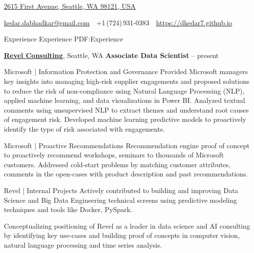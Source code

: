 \documentclass[letterpaper,MMMyyyy,nonstopmode]{simpleresumecv}
\newcommand{\CVAuthor}{Kedar Dabhadkar}
\newcommand{\CVWebpage}{https://dkedar7.github.io}
\begin{document}

\Title{\CVAuthor}

\begin{SubTitle}
\href{https://www.google.com/maps/place/2619+First+Avenue,+Seattle,+WA+98121,+USA}
{2615 First Avenue, Seattle, WA 98121, USA}
\par
\href{mailto:kedar.dabhadkar@gmail.com}
{kedar.dabhadkar@gmail.com}
\,\SubBulletSymbol\,
+1\,(724)\,931-0383
\,\SubBulletSymbol\,
\href{\CVWebpage}
{\url{\CVWebpage}}
\end{SubTitle}

\begin{Body}

\Section
{Experience}
{Experience}
{PDF:Experience}

\Entry
\href{http://www.revelconsulting.com/}
{\textbf{Revel Consulting}},
Seattle, WA
\Entry
\textbf{Associate Data Scientist}
\hfill
{} --
present

\Gap
\BulletItem
Microsoft | Information Protection and Governance
\SubBulletItem
Provided Microsoft managers key insights into managing high-risk supplier engagements and proposed solutions to reduce the risk of non-compliance using Natural Language Processing (NLP), applied machine learning, and data visualizations in Power BI.
\SubBulletItem
Analyzed textual comments using unsupervised NLP to extract themes and understand root causes of engagement risk.
\SubBulletItem
Developed machine learning predictive models to proactively identify the type of risk associated with engagements.

\BulletItem
Microsoft | Proactive Recommendations
\SubBulletItem
Recommendation engine proof of concept to proactively recommend workshops, seminars to thousands of Microsoft customers.
\SubBulletItem
Addressed cold-start problems by matching customer attributes, comments in the open-cases with product description and past recommendations.

\BulletItem
Revel | Internal Projects
\SubBulletItem
Actively contributed to building and improving Data Science and Big Data Engineering technical screens using predictive modeling techniques and tools like Docker, PySpark.

\SubBulletItem
Conceptualizing positioning of Revel as a leader in data science and AI consulting by identifying key use-cases and building proof of concepts in computer vision, natural language processing and time series analysis.


\end{Body}
\end{document}
